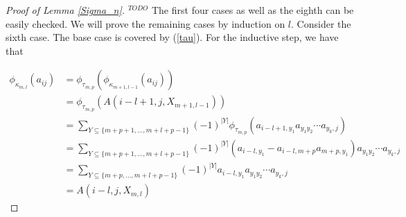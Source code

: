 \documentclass[11pt]{amsart}
\def\todoit{{\color{red} $^{TODO}$}} %
\def\C{{\mathbb C}}
\def\A{{\mathcal A}}
\def\t{{\tau}}
\def\k{{\kappa}}
\newtheorem{thm}{Theorem}[section]
\begin{document}
\begin{proof} [Proof of Lemma \ref{Sigma_n}]\todoit
The first four cases as well as the eighth can be easily checked.  We will prove the remaining cases by induction on $l$.  Consider the sixth case.  The base case is covered by (\ref{tau}).  For the inductive step, we have that

\begin{align*}
\phi_{\k_{m,l}}(a_{ij}) &= \phi_{\t_{m,p}}\left(\phi_{\k_{m+1,l-1}}(a_{ij})\right)\\
&= \phi_{\t_{m,p}}\left(A(i-l+1,j,X_{m+1,l-1})\right)\\
&= \sum_{Y\subseteq \{m+p+1,\ldots,m+l+p-1\}} (-1)^{|Y|} \phi_{\t_{m,p}}\left(a_{i-l+1,y_1}a_{y_1y_2}\cdots a_{y_k,j}\right)\\
&= \sum_{Y\subseteq \{m+p+1,\ldots,m+l+p-1\}} (-1)^{|Y|} \left(a_{i-l,y_1}-a_{i-l,m+p}a_{m+p,y_1}\right)a_{y_1y_2}\cdots a_{y_k,j}\\
&= \sum_{Y\subseteq \{m+p,\ldots,m+l+p-1\}} (-1)^{|Y|} a_{i-l,y_1}a_{y_1y_2}\cdots a_{y_k,j}\\
&= A(i-l,j,X_{m,l})
\end{align*}



\end{proof}













\end{document}
